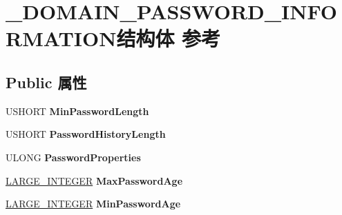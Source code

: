 \hypertarget{struct___d_o_m_a_i_n___p_a_s_s_w_o_r_d___i_n_f_o_r_m_a_t_i_o_n}{}\section{\+\_\+\+D\+O\+M\+A\+I\+N\+\_\+\+P\+A\+S\+S\+W\+O\+R\+D\+\_\+\+I\+N\+F\+O\+R\+M\+A\+T\+I\+O\+N结构体 参考}
\label{struct___d_o_m_a_i_n___p_a_s_s_w_o_r_d___i_n_f_o_r_m_a_t_i_o_n}
\subsection*{Public 属性}
\begin{DoxyCompactItemize}
\item 
\mbox{\label{struct___d_o_m_a_i_n___p_a_s_s_w_o_r_d___i_n_f_o_r_m_a_t_i_o_n_ae66ce392a4dc0767ddc62857a7cc20f0}} 
U\+S\+H\+O\+RT {\bfseries Min\+Password\+Length}
\item 
\mbox{\label{struct___d_o_m_a_i_n___p_a_s_s_w_o_r_d___i_n_f_o_r_m_a_t_i_o_n_a139653bc0ebb0f1fa2654199b514c9a9}} 
U\+S\+H\+O\+RT {\bfseries Password\+History\+Length}
\item 
\mbox{\label{struct___d_o_m_a_i_n___p_a_s_s_w_o_r_d___i_n_f_o_r_m_a_t_i_o_n_a339bdbc29d42f8d35b19dbd2747aa53b}} 
U\+L\+O\+NG {\bfseries Password\+Properties}
\item 
\mbox{\label{struct___d_o_m_a_i_n___p_a_s_s_w_o_r_d___i_n_f_o_r_m_a_t_i_o_n_aaeadf793f6face39d6d77ef5d47c43a0}} 
\hyperlink{union___l_a_r_g_e___i_n_t_e_g_e_r}{L\+A\+R\+G\+E\+\_\+\+I\+N\+T\+E\+G\+ER} {\bfseries Max\+Password\+Age}
\item 
\mbox{\label{struct___d_o_m_a_i_n___p_a_s_s_w_o_r_d___i_n_f_o_r_m_a_t_i_o_n_a3105e4043724920d59c33c3e612b0c90}} 
\hyperlink{union___l_a_r_g_e___i_n_t_e_g_e_r}{L\+A\+R\+G\+E\+\_\+\+I\+N\+T\+E\+G\+ER} {\bfseries Min\+Password\+Age}

\end{DoxyCompactItemize}
